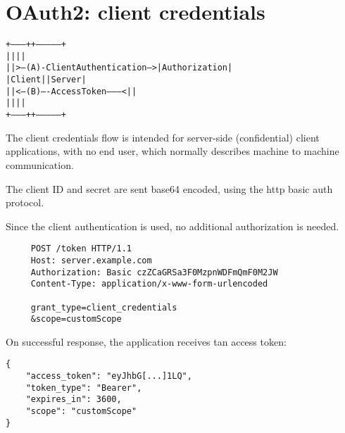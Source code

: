 \section{OAuth2: client credentials}
\begin{alltt}
     +---------+                                  +---------------+
     |         |                                  |               |
     |         |>--(A)- Client Authentication --->| Authorization |
     | Client  |                                  |     Server    |
     |         |<--(B)---- Access Token ---------<|               |
     |         |                                  |               |
     +---------+                                  +---------------+
\end{alltt}
The client credentials flow is intended for server-side (confidential) client
applications, with no end user, which normally describes machine to machine
communication.

The client ID and secret are sent base64 encoded, using the http basic
auth protocol.

Since the client authentication is used, no additional authorization is needed.

\begin{lstlisting}
     POST /token HTTP/1.1
     Host: server.example.com
     Authorization: Basic czZCaGRSa3F0MzpnWDFmQmF0M2JW
     Content-Type: application/x-www-form-urlencoded

     grant_type=client_credentials
     &scope=customScope
\end{lstlisting}

On successful response, the application receives tan access token:
\begin{lstlisting}
{
    "access_token": "eyJhbG[...]1LQ",
    "token_type": "Bearer",
    "expires_in": 3600,
    "scope": "customScope"
}
\end{lstlisting}

